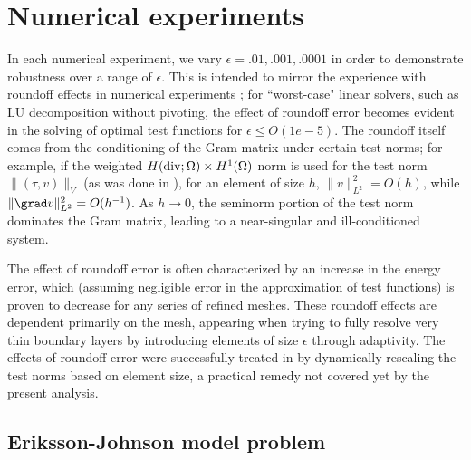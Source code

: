 \section{Numerical experiments}
\label{sec:num_exp}

In each numerical experiment, we vary $\epsilon = .01, .001, .0001$ in order to demonstrate robustness over a range of $\epsilon$.  This is intended to mirror the experience with roundoff effects in numerical experiments \cite{DPGrobustness}; for ``worst-case" linear solvers, such as LU decomposition without pivoting, the effect of roundoff error becomes evident in the solving of optimal test functions for $\epsilon \leq O(1e-5)$.  The roundoff itself comes from the conditioning of the Gram matrix under certain test norms; for example, if the weighted $H({\rm div};\Omega)\times H^1(\Omega)$ norm is used for the test norm $\|\left(\tau,v\right)\|_V$ (as was done in \cite{DPG2}), for an element of size $h$, $\|v\|_{L^2}^2 = O(h)$, while $\|\grad v\|_{L^2}^2 = O(h^{-1})$. As $h\rightarrow 0$, the seminorm portion of the test norm dominates the Gram matrix, leading to a near-singular and ill-conditioned system. 

The effect of roundoff error is often characterized by an increase in the energy error, which (assuming negligible error in the approximation of test functions) is proven to decrease for any series of refined meshes. These roundoff effects are dependent primarily on the mesh, appearing when trying to fully resolve very thin boundary layers by introducing elements of size $\epsilon$ through adaptivity. The effects of roundoff error were successfully treated in \cite{DPG3} by dynamically rescaling the test norms based on element size, a practical remedy not covered yet by the present analysis. 

\subsection{Eriksson-Johnson model problem}

